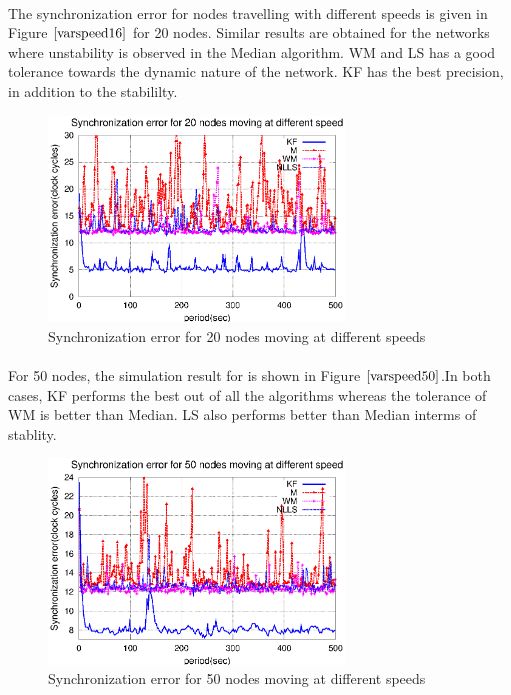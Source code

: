 \documentclass[a4paper,10pt]{report}
\begin{document}
\paragraph*{}
The synchronization error for nodes travelling with different speeds is given in Figure $\ref{varspeed16}$ for 20 nodes. Similar results are obtained for the networks where unstability is observed in the Median algorithm. WM and LS has a good tolerance towards the dynamic nature of the network. KF has the best precision, in addition to the stabililty.
\begin{figure}[!h]
 \centering
 \includegraphics[width=0.7\textwidth]{varspeed20}
 \caption{Synchronization error for 20 nodes moving at different speeds}
 \label{varspeed16}
\end{figure}
\paragraph*{}
For 50 nodes, the simulation result for is shown in Figure $\ref{varspeed50}$.In both cases, KF performs the best out of all the algorithms whereas the tolerance of WM is better than Median. LS also performs better than Median interms of stablity.
\begin{figure}[!h]
 \centering
 \includegraphics[width=0.7\textwidth]{varspeed50}
 \caption{Synchronization error for 50 nodes moving at different speeds}
 \label{varspeed50}
\end{figure}
\end{document}
